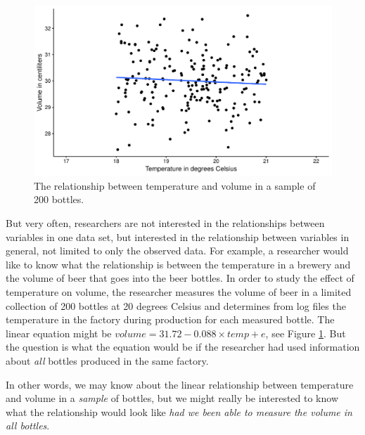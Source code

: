 \documentclass[]{book}\usepackage[]{graphicx}\usepackage[]{color}
\makeatletter
\def\maxwidth{ %
  \ifdim\Gin@nat@width>\linewidth
    \linewidth
  \else
    \Gin@nat@width
  \fi
}
\newenvironment{knitrout}{}{} %
\makeatother
\begin{document}
\begin{knitrout}
\color{fgcolor}\begin{figure}

{\centering \includegraphics[width=\maxwidth]{figure/inf_0-1} 

}

\caption[The relationship between temperature and volume in a sample of 200 bottles]{The relationship between temperature and volume in a sample of 200 bottles.}\label{fig:inf_0}
\end{figure}


\end{knitrout}


But very often, researchers are not interested in the relationships between variables in one data set, but interested in the relationship between variables in general, not limited to only the observed data. For example, a researcher would like to know what the relationship is between the temperature in a brewery and the volume of beer that goes into the beer bottles. In order to study the effect of temperature on volume, the researcher measures the volume of beer in a limited collection of 200 bottles at 20 degrees Celsius and determines from log files the temperature in the factory during production for each measured bottle. The linear equation might be $volume = 31.72 -0.088 \times temp + e$, see Figure \ref{fig:inf_0}. But the question is what the equation would be if the researcher had used information about \textit{all} bottles produced in the same factory.



In other words, we may know about the linear relationship between temperature and volume in a \textit{sample} of bottles, but we might really be interested to know what the relationship would look like \textit{had we been able to measure the volume in all bottles}.
\end{document}
